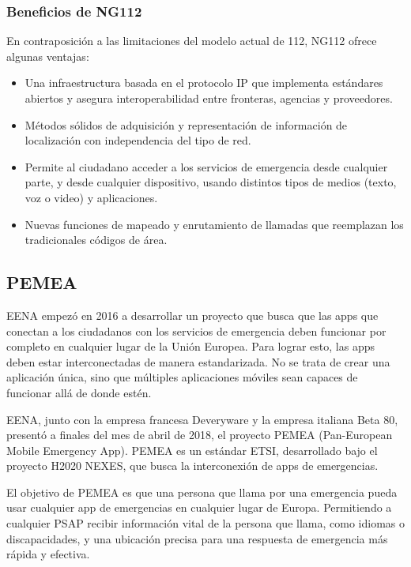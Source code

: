 \subsubsection{Beneficios de NG112}

En contraposición a las limitaciones del modelo actual de 112, NG112 ofrece algunas ventajas:

\begin{itemize}
  \item Una infraestructura basada en el protocolo IP que implementa estándares abiertos y asegura interoperabilidad entre fronteras, agencias y proveedores.
  \item Métodos sólidos de adquisición y representación de información de localización con independencia del tipo de red.
  \item Permite al ciudadano acceder a los servicios de emergencia desde cualquier parte, y desde cualquier dispositivo, usando distintos tipos de medios (texto, voz o video) y aplicaciones.
  \item Nuevas funciones de mapeado y enrutamiento de llamadas que reemplazan los tradicionales códigos de área.
\end{itemize}

\subsection{PEMEA}

EENA empezó en 2016 a desarrollar un proyecto que busca que las apps que conectan a los ciudadanos con los servicios de emergencia deben funcionar por completo en cualquier lugar de la Unión Europea. Para lograr esto, las apps deben estar interconectadas de manera estandarizada. No se trata de crear una aplicación única, sino que múltiples aplicaciones móviles sean capaces de funcionar allá de donde estén.

EENA, junto con la empresa francesa Deveryware y la empresa italiana Beta 80, presentó a finales del mes de abril de 2018, el proyecto PEMEA (Pan-European Mobile Emergency App). PEMEA es un estándar ETSI, desarrollado bajo el proyecto H2020 NEXES, que busca la interconexión de apps de emergencias.

El objetivo de PEMEA es que una persona que llama por una emergencia pueda usar cualquier app de emergencias en cualquier lugar de Europa. Permitiendo a cualquier PSAP recibir información vital de la persona que llama, como idiomas o discapacidades, y una ubicación precisa para una respuesta de emergencia más rápida y efectiva.

